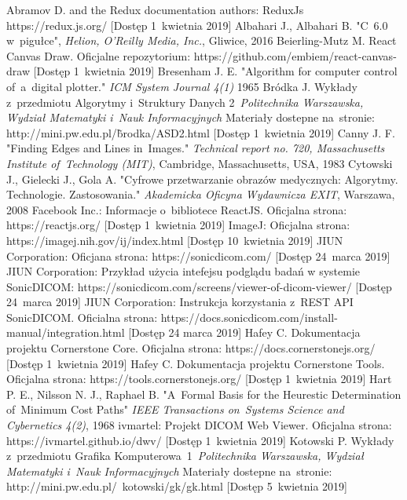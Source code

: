 \documentclass[a4paper,11pt,twoside,openright]{report}
\theoremstyle{definition}
\begin{document}
\begin{thebibliography}{24}
 Abramov D. and the Redux documentation authors: ReduxJs https://redux.js.org/ [Dostęp 1~kwietnia 2019]
 Albahari J., Albahari B. "C~6.0 w~pigułce", \emph{Helion, O'Reilly Media, Inc.}, Gliwice,  2016
 Beierling-Mutz M. React Canvas Draw. Oficjalne repozytorium: https://github.com/embiem/react-canvas-draw [Dostęp 1~kwietnia 2019]
 Bresenham J. E. "Algorithm for computer control of~a~digital plotter." \emph{ICM System Journal 4(1)} 1965
 Bródka J. Wykłady z~przedmiotu Algorytmy i~Struktury Danych 2~\emph{Politechnika Warszawska, Wydział Matematyki i~Nauk Informacyjnych} Materiały dostepne na~stronie: http://mini.pw.edu.pl/\~brodka/ASD2.html [Dostęp 1~kwietnia 2019]
 Canny J. F. "Finding Edges and Lines in~Images." \emph{Technical report no. 720, Massachusetts Institute of~Technology (MIT)}, Cambridge, Massachusetts, USA, 1983
 Cytowski J., Gielecki J., Gola A. "Cyfrowe przetwarzanie obrazów medycznych: Algorytmy. Technologie. Zastosowania." \emph{Akademicka Oficyna Wydawnicza EXIT}, Warszawa, 2008
 Facebook Inc.: Informacje o~bibliotece ReactJS. Oficjalna strona: https://reactjs.org/ [Dostęp 1~kwietnia 2019]
 ImageJ: Oficjalna strona: https://imagej.nih.gov/ij/index.html [Dostęp 10~kwietnia 2019]
 JIUN Corporation: Oficjana strona: https://sonicdicom.com/ [Dostęp 24~marca 2019]
 JIUN Corporation: Przykład użycia intefejsu podglądu badań w systemie SonicDICOM: https://sonicdicom.com/screens/viewer-of-dicom-viewer/ [Dostęp 24~marca 2019]
 JIUN Corporation: Instrukcja korzystania z~REST API SonicDICOM. Oficialna strona: https://docs.sonicdicom.com/install-manual/integration.html [Dostęp 24 marca 2019]
 Hafey C. Dokumentacja projektu Cornerstone Core. Oficjalna strona: https://docs.cornerstonejs.org/ [Dostęp 1~kwietnia 2019]
 Hafey C. Dokumentacja projektu Cornerstone Tools. Oficjalna strona: https://tools.cornerstonejs.org/ [Dostęp 1~kwietnia 2019]
 Hart P. E., Nilsson N. J., Raphael B. "A~Formal Basis for the Heurestic Determination of~Minimum Cost Paths" \emph{IEEE Transactions on~Systems Science and Cybernetics 4(2)}, 1968
 ivmartel: Projekt DICOM Web Viewer. Oficjalna strona: https://ivmartel.github.io/dwv/ [Dostęp 1~kwietnia 2019]
 Kotowski P. Wykłady z~przedmiotu Grafika Komputerowa~1~\emph{Politechnika Warszawska, Wydział Matematyki i~Nauk Informacyjnych} Materiały dostepne na~stronie: http://mini.pw.edu.pl/~kotowski/gk/gk.html [Dostęp 5~kwietnia 2019]

\end{thebibliography}
\end{document}

